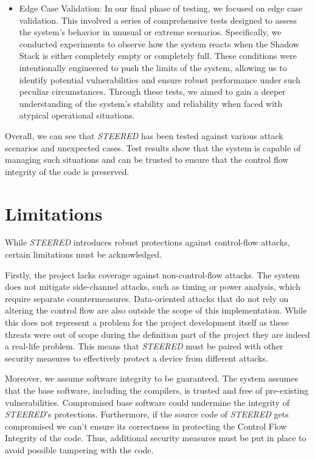 \begin{itemize}
  \item Edge Case Validation: In our final phase of testing, we focused on edge case
    validation. This involved a series of comprehensive tests designed to assess
    the system's behavior in unusual or extreme scenarios. Specifically, we
    conducted experiments to observe how the system reacts when the Shadow Stack
    is either completely empty or completely full. These conditions were intentionally
    engineered to push the limits of the system, allowing us to identify
    potential vulnerabilities and ensure robust performance under such peculiar
    circumstances. Through these tests, we aimed to gain a deeper understanding
    of the system's stability and reliability when faced with atypical
    operational situations.
\end{itemize}

Overall, we can see that \textit{STEERED} has been tested against various attack
scenarios and unexpected cases. Test results show that the system is capable of managing
such situations and can be trusted to ensure that the control flow integrity of the
code is preserved.

\section{Limitations}
\label{sec:ta_limitations}

While \textit{STEERED} introduces robust protections against control-flow attacks,
certain limitations must be acknowledged.

Firstly, the project lacks coverage against non-control-flow attacks. The system
does not mitigate side-channel attacks, such as timing or power analysis, which
require separate countermeasures. Data-oriented attacks that do not rely on altering
the control flow are also outside the scope of this implementation. While this
does not represent a problem for the project development itself as these threats
were out of scope during the definition part of the project they are indeed a
real-life problem. This means that \textit{STEERED} must be paired with other
security measures to effectively protect a device from different attacks.

Moreover, we assume software integrity to be guaranteed. The system assumes that
the base software, including the compilers, is trusted and free of pre-existing
vulnerabilities. Compromised base software could undermine the integrity of \textit{STEERED}'s
protections. Furthermore, if the source code of \textit{STEERED} gets compromised
we can't ensure its correctness in protecting the Control Flow Integrity of the code.
Thus, additional security measures must be put in place to avoid possible tampering
with the code.


